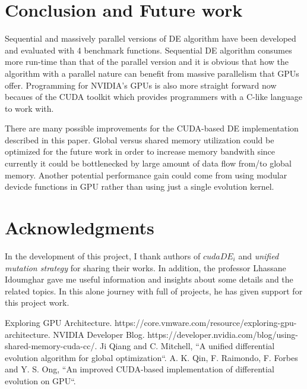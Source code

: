 \documentclass[conference]{IEEEtran}
\begin{document}
\section{Conclusion and Future work}
Sequential and massively parallel versions of DE algorithm have been developed and evaluated with 4 benchmark functions. Sequential DE algorithm consumes more run-time than that of the parallel version and 
it is obvious that how the algorithm with a parallel nature can benefit from massive parallelism that GPUs offer. Programming for NVIDIA's GPUs is also more straight forward now becaues of the CUDA toolkit 
which provides programmers with a C-like language to work with.

There are many possible improvements for the CUDA-based DE implementation described in this paper. Global versus shared memory utilization could be optimized for the future work in order to increase 
memory bandwith since currently it could be bottlenecked by large amount of data flow from/to global memory. Another potential performance gain could come from using modular devicde functions in GPU 
rather than using just a single evolution kernel.

\section{Acknowledgments}
In the development of this project, I thank authors of $\textit{cudaDE}_\textit{i}$ and \textit{unified mutation strategy} for sharing their works. In addition, the professor Lhassane Idoumghar gave me 
useful information and insights about some details and the related topics. In this alone journey with full of projects, he has given support for this project work.

\begin{thebibliography}{00}
 Exploring GPU Architecture. https://core.vmware.com/resource/exploring-gpu-architecture.
 NVIDIA Developer Blog. https://developer.nvidia.com/blog/using-shared-memory-cuda-cc/.
 Ji Qiang and C. Mitchell, ``A unified differential evolution algorithm for global optimization``.
 A. K. Qin, F. Raimondo, F. Forbes and Y. S. Ong, ``An improved CUDA-based implementation of differential evolution on GPU``.
\end{thebibliography}
\end{document}
